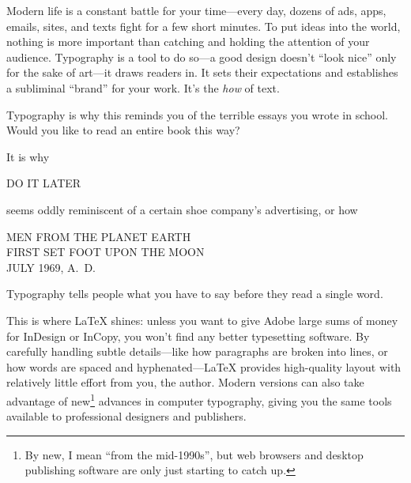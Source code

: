 Modern life is a constant battle for your time---every day,
dozens of ads, apps, emails, sites, and texts fight
for a few short minutes.
To put ideas into the world,
nothing is more important than catching and holding
the attention of your audience.
Typography is a tool to do so---a good design doesn't ``look nice''
only for the sake of art---it draws readers in.\punckern{}
It sets their expectations and establishes a subliminal ``brand'' for your
work.\punckern{}
It's the \emph{how} of text.
\begin{leftfigure}
\fontsize{12pt}{24pt}\selectfont\raggedright
Typography is why this reminds you of the terrible essays
you wrote in school.
Would you like to read an entire book this way?
\end{leftfigure}
It is why
\begin{leftfigure}
\noindent{}\Large DO IT LATER
\end{leftfigure}
seems oddly reminiscent of a certain shoe company's advertising,
or how
\begin{center}
\noindent MEN FROM THE PLANET EARTH \\
FIRST SET FOOT UPON THE MOON \\
JULY 1969, A.~D.
\end{center}
Typography tells people
what you have to say before they read a single word.

This is where \LaTeX{} shines: unless you want to give Adobe large sums
of money for InDesign or InCopy,
you won't find any better typesetting software.
By carefully handling subtle details---like how paragraphs are broken into lines,
or how words are spaced and hyphenated---\LaTeX{} provides high-quality layout
with relatively little effort from you, the author.
Modern versions can also take advantage of new\footnote{By new,
I mean ``from the mid-1990s''\quotekern, but web browsers and desktop publishing
software are only just starting to catch up.} advances in computer typography,
giving you the same tools available to professional designers and publishers.

